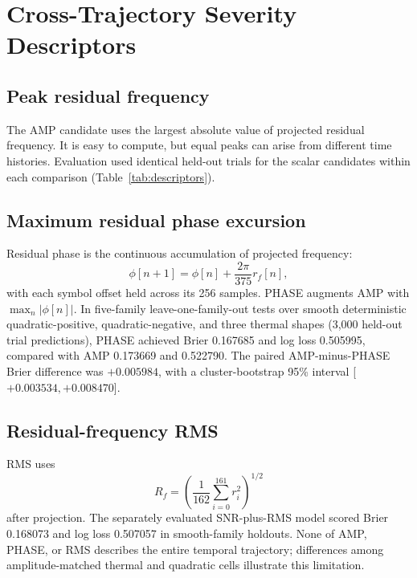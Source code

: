 \documentclass[conference]{IEEEtran}
\begin{document}
\section{Cross-Trajectory Severity Descriptors}
\subsection{Peak residual frequency}
The AMP candidate uses the largest absolute value of projected residual frequency. It is easy to compute, but equal peaks can arise from different time histories. Evaluation used identical held-out trials for the scalar candidates within each comparison (Table~\ref{tab:descriptors}).

\subsection{Maximum residual phase excursion}
Residual phase is the continuous accumulation of projected frequency:
\begin{equation}
\phi[n+1]=\phi[n]+\frac{2\pi}{375}r_f[n],
\label{eq:phase}
\end{equation}
with each symbol offset held across its 256 samples. PHASE augments AMP with $\max_n|\phi[n]|$. In five-family leave-one-family-out tests over smooth deterministic quadratic-positive, quadratic-negative, and three thermal shapes (3,000 held-out trial predictions), PHASE achieved Brier 0.167685 and log loss 0.505995, compared with AMP 0.173669 and 0.522790. The paired AMP-minus-PHASE Brier difference was $+0.005984$, with a cluster-bootstrap 95\% interval [$+0.003534,+0.008470$].

\subsection{Residual-frequency RMS}
RMS uses
\begin{equation}
R_f=\left(\frac{1}{162}\sum_{i=0}^{161}r_i^2\right)^{1/2}
\label{eq:rms}
\end{equation}
after projection. The separately evaluated SNR-plus-RMS model scored Brier 0.168073 and log loss 0.507057 in smooth-family holdouts. None of AMP, PHASE, or RMS describes the entire temporal trajectory; differences among amplitude-matched thermal and quadratic cells illustrate this limitation.
\end{document}
